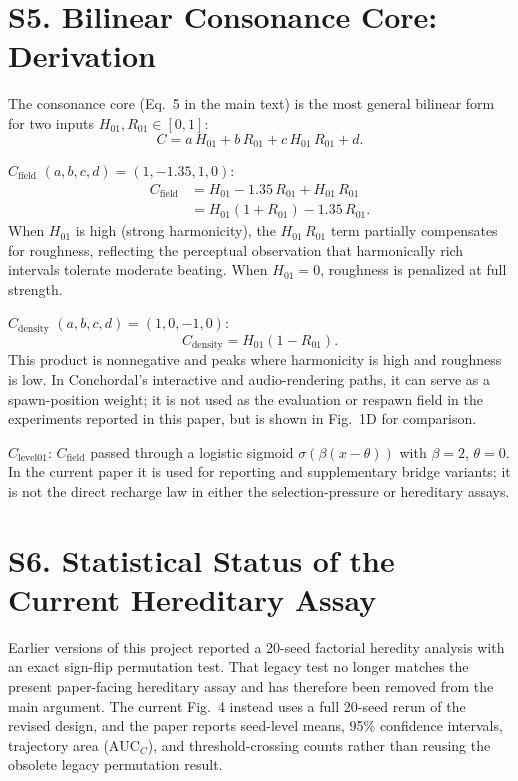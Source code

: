 \documentclass[letterpaper]{article}
\begin{document}
\section{S5. Bilinear Consonance Core: Derivation}

The consonance core (Eq.~5 in the main text) is the most general bilinear form for two inputs $H_{01}, R_{01} \in [0,1]$:
\begin{equation}
C = a\,H_{01} + b\,R_{01} + c\,H_{01}\,R_{01} + d.
\end{equation}

\noindent\textbf{$C_{\text{field}}$} $(a,b,c,d) = (1, -1.35, 1, 0)$:
\begin{align}
C_{\text{field}} &= H_{01} - 1.35\,R_{01} + H_{01}\,R_{01} \\
                 &= H_{01}(1 + R_{01}) - 1.35\,R_{01}.
\end{align}
When $H_{01}$ is high (strong harmonicity), the $H_{01}\,R_{01}$ term partially compensates for roughness, reflecting the perceptual observation that harmonically rich intervals tolerate moderate beating. When $H_{01} = 0$, roughness is penalized at full strength.

\noindent\textbf{$C_{\text{density}}$} $(a,b,c,d) = (1, 0, -1, 0)$:
\begin{equation}
C_{\text{density}} = H_{01}(1 - R_{01}).
\end{equation}
This product is nonnegative and peaks where harmonicity is high and roughness is low. In Conchordal's interactive and audio-rendering paths, it can serve as a spawn-position weight; it is not used as the evaluation or respawn field in the experiments reported in this paper, but is shown in Fig.~1D for comparison.

\noindent\textbf{$C_{\text{level01}}$}: $C_{\text{field}}$ passed through a logistic sigmoid $\sigma(\beta(x - \theta))$ with $\beta=2$, $\theta=0$. In the current paper it is used for reporting and supplementary bridge variants; it is not the direct recharge law in either the selection-pressure or hereditary assays.

\section{S6. Statistical Status of the Current Hereditary Assay}

Earlier versions of this project reported a 20-seed factorial heredity analysis with an exact sign-flip permutation test. That legacy test no longer matches the present paper-facing hereditary assay and has therefore been removed from the main argument. The current Fig.~4 instead uses a full 20-seed rerun of the revised design, and the paper reports seed-level means, 95\% confidence intervals, trajectory area ($\mathrm{AUC}_C$), and threshold-crossing counts rather than reusing the obsolete legacy permutation result.
\end{document}

